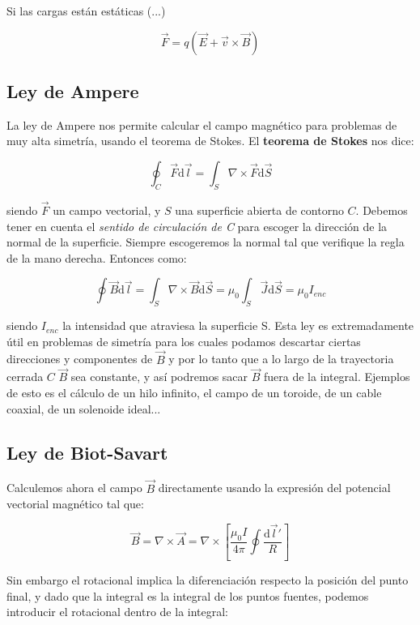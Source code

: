 \documentclass[12pt]{article}
\newcommand{\ccorchetes}[1]{\left[ #1  \right]}
\newcommand{\D}{\mathrm{d}}
\newcommand{\rota}{\nabla \times}
\begin{document}
Si las cargas están estáticas (...)

\begin{equation}
\vec{F} = q (\vec{E} + \vec{v} \times \vec{B})
\end{equation}

\subsection{Ley de Ampere}

La ley de Ampere nos permite calcular el campo magnético para problemas de muy alta simetría, usando el teorema de Stokes. El \textbf{teorema de Stokes} nos dice:

\begin{equation}
\oint_C \vec{F} \D \vec{l} = \int_S \rota \vec{F} \D \vec{S}
\end{equation}

siendo $\vec{F}$ un campo vectorial, y $S$ una superficie abierta de contorno $C$. Debemos tener en cuenta el \textit{sentido de circulación de C} para escoger la dirección de la normal de la superficie. Siempre escogeremos la normal tal que verifique la regla de la mano derecha. Entonces como:

\begin{equation}
\oint \vec{B} \D \vec{l} = \int_S \rota \vec{B} \D \vec{S} = \mu_0 \int_S \vec{J} \D \vec{S} = \mu_0 I_{enc}
\end{equation}

siendo $I_{enc}$ la intensidad que atraviesa la superficie S. Esta ley es extremadamente útil en problemas de simetría para los cuales podamos descartar ciertas direcciones y componentes de $\vec{B}$ y por lo tanto que a lo largo de la trayectoria cerrada $C$ $\vec{B}$ sea constante, y así podremos sacar $\vec{B}$ fuera de la integral. Ejemplos de esto es el cálculo de un hilo infinito, el campo de un toroide, de un cable coaxial, de un solenoide ideal...


\subsection{Ley de Biot-Savart}

Calculemos ahora el campo $\vec{B}$ directamente usando la expresión del potencial vectorial magnético tal que:

$$ \vec{B} = \rota \vec{A} = \rota \ccorchetes{\dfrac{\mu_0 I}{4 \pi} \oint \dfrac{\D \vec{l}'}{R}} $$

Sin embargo el rotacional implica la diferenciación respecto la posición del punto final, y dado que la integral es la integral de los puntos fuentes, podemos introducir el rotacional dentro de la integral:
\end{document}
